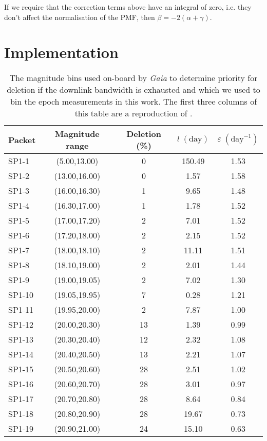 \documentclass[fleqn,usenatbib]{mnras}
\newcommand{\gaia}{{\it Gaia}\xspace}
\begin{document}
If we require that the correction terms above have an integral of zero, i.e. they don't affect the normalisation of the PMF, then $\beta = -2(\alpha+\gamma)$.

\section{Implementation}

\begin{table}
\centering
\caption{The magnitude bins used on-board by \gaia to determine priority for deletion if the downlink bandwidth is exhausted and which we used to bin the epoch measurements in this work. %
The first three columns of this table are a reproduction of  \citealp[Table 1.10 Sec. 1.3.3 of][]{2018gdr2.reptE...1D}. }
\begin{tabular}{lcccc}
\hline Packet & Magnitude range & Deletion (\%) & $l\;(\mathrm{day})$ & $\varepsilon\;(\mathrm{day}^{-1})$ \\
\hline SP1-1 & (5.00,13.00) & 0 & 150.49 & 1.53  \\
SP1-2 & (13.00,16.00) & 0 & 1.57 & 1.58  \\
SP1-3 & (16.00,16.30) & 1 & 9.65 & 1.48  \\
SP1-4 & (16.30,17.00) & 1 & 1.78 & 1.52  \\
SP1-5 & (17.00,17.20) & 2 & 7.01 & 1.52  \\
SP1-6 & (17.20,18.00) & 2 & 2.15 & 1.52  \\
SP1-7 & (18.00,18.10) & 2 & 11.11 & 1.51  \\
SP1-8 & (18.10,19.00) & 2 & 2.01 & 1.44  \\
SP1-9 & (19.00,19.05) & 2 & 7.02 & 1.30  \\
SP1-10 & (19.05,19.95) & 7 & 0.28 & 1.21  \\
SP1-11 & (19.95,20.00) & 2 & 7.87 & 1.00  \\
SP1-12 & (20.00,20.30) & 13 & 1.39 & 0.99  \\
SP1-13 & (20.30,20.40) & 12 & 2.32 & 1.08  \\
SP1-14 & (20.40,20.50) & 13 & 2.21 & 1.07  \\
SP1-15 & (20.50,20.60) & 28 & 2.51 & 1.02  \\
SP1-16 & (20.60,20.70) & 28 & 3.01 & 0.97  \\
SP1-17 & (20.70,20.80) & 28 & 8.64 & 0.84  \\
SP1-18 & (20.80,20.90) & 28 & 19.67 & 0.73  \\
SP1-19 & (20.90,21.00) & 24 & 15.10 & 0.63  \\     \hline
\end{tabular}
\label{tab:spbins}
\end{table}
\end{document}
